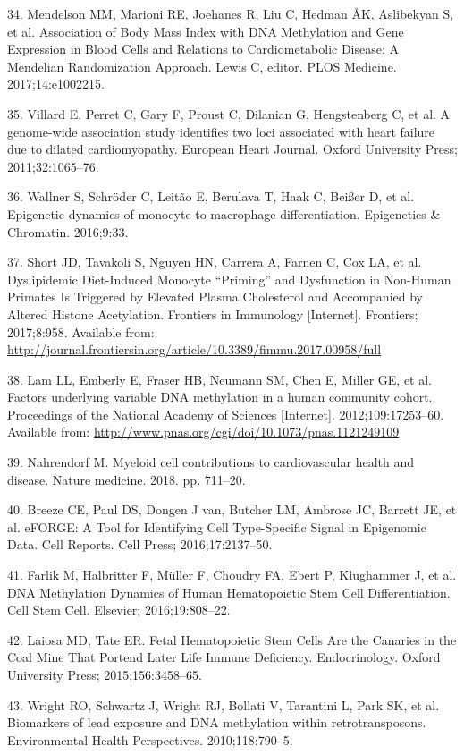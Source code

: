 \documentclass[]{bmcart}
\theoremstyle{definition}
\theoremstyle{definition}
\theoremstyle{definition}
\theoremstyle{remark}
\begin{document}
34. Mendelson MM, Marioni RE, Joehanes R, Liu C, Hedman ÅK, Aslibekyan
S, et al. Association of Body Mass Index with DNA Methylation and Gene
Expression in Blood Cells and Relations to Cardiometabolic Disease: A
Mendelian Randomization Approach. Lewis C, editor. PLOS Medicine.
2017;14:e1002215.

35. Villard E, Perret C, Gary F, Proust C, Dilanian G, Hengstenberg C,
et al. A genome-wide association study identifies two loci associated
with heart failure due to dilated cardiomyopathy. European Heart
Journal. Oxford University Press; 2011;32:1065--76.

36. Wallner S, Schr{ö}der C, Leit{ã}o E, Berulava T, Haak C, Bei{ß}er D,
et al. Epigenetic dynamics of monocyte-to-macrophage differentiation.
Epigenetics \& Chromatin. 2016;9:33.

37. Short JD, Tavakoli S, Nguyen HN, Carrera A, Farnen C, Cox LA, et al.
Dyslipidemic Diet-Induced Monocyte ``Priming'' and Dysfunction in
Non-Human Primates Is Triggered by Elevated Plasma Cholesterol and
Accompanied by Altered Histone Acetylation. Frontiers in Immunology
{[}Internet{]}. Frontiers; 2017;8:958. Available from:
\url{http://journal.frontiersin.org/article/10.3389/fimmu.2017.00958/full}

38. Lam LL, Emberly E, Fraser HB, Neumann SM, Chen E, Miller GE, et al.
Factors underlying variable DNA methylation in a human community cohort.
Proceedings of the National Academy of Sciences {[}Internet{]}.
2012;109:17253--60. Available from:
\url{http://www.pnas.org/cgi/doi/10.1073/pnas.1121249109}

39. Nahrendorf M. Myeloid cell contributions to cardiovascular health
and disease. Nature medicine. 2018. pp. 711--20.

40. Breeze CE, Paul DS, Dongen J van, Butcher LM, Ambrose JC, Barrett
JE, et al. eFORGE: A Tool for Identifying Cell Type-Specific Signal in
Epigenomic Data. Cell Reports. Cell Press; 2016;17:2137--50.

41. Farlik M, Halbritter F, M{ü}ller F, Choudry FA, Ebert P, Klughammer
J, et al. DNA Methylation Dynamics of Human Hematopoietic Stem Cell
Differentiation. Cell Stem Cell. Elsevier; 2016;19:808--22.

42. Laiosa MD, Tate ER. Fetal Hematopoietic Stem Cells Are the Canaries
in the Coal Mine That Portend Later Life Immune Deficiency.
Endocrinology. Oxford University Press; 2015;156:3458--65.

43. Wright RO, Schwartz J, Wright RJ, Bollati V, Tarantini L, Park SK,
et al. Biomarkers of lead exposure and DNA methylation within
retrotransposons. Environmental Health Perspectives. 2010;118:790--5.
\end{document}
